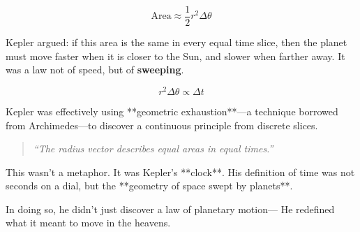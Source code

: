 \[
\text{Area} \approx \frac{1}{2} r^2 \Delta\theta
\]

Kepler argued: if this area is the same in every equal time slice, then the planet must move faster when it is closer to the Sun, and slower when farther away. It was a law not of speed, but of \textbf{sweeping}.

\[
r^2 \Delta\theta \propto \Delta t
\]

Kepler was effectively using **geometric exhaustion**—a technique borrowed from Archimedes—to discover a continuous principle from discrete slices.

\begin{quote}
\textit{“The radius vector describes equal areas in equal times.”}
\end{quote}

This wasn’t a metaphor. It was Kepler’s **clock**. His definition of time was not seconds on a dial, but the **geometry of space swept by planets**.

In doing so, he didn’t just discover a law of planetary motion—  
He redefined what it meant to move in the heavens.

